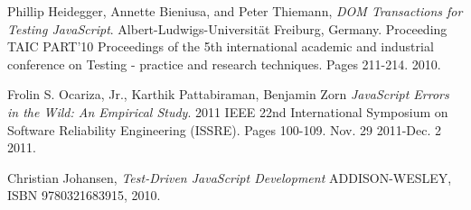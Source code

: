 \documentclass[11pt]{article}
\begin{document}
\begin{thebibliography}{9}
  Phillip Heidegger, Annette Bieniusa, and Peter Thiemann,
  \emph{DOM Transactions for Testing JavaScript}.
  Albert-Ludwigs-Universität Freiburg, Germany.
  Proceeding TAIC PART'10 Proceedings of the 5th international academic and industrial conference on Testing - practice and research techniques.
  Pages 211-214.
  2010.

  Frolin S. Ocariza, Jr., Karthik Pattabiraman, Benjamin Zorn
  \emph{JavaScript Errors in the Wild: An Empirical Study}.
  2011 IEEE 22nd International Symposium on Software Reliability Engineering (ISSRE).
  Pages 100-109.
  Nov. 29 2011-Dec. 2 2011.

  Christian Johansen,
  \emph{Test-Driven JavaScript Development}
  ADDISON-WESLEY,
  ISBN 9780321683915,
  2010.

\end{thebibliography}
\end{document}
